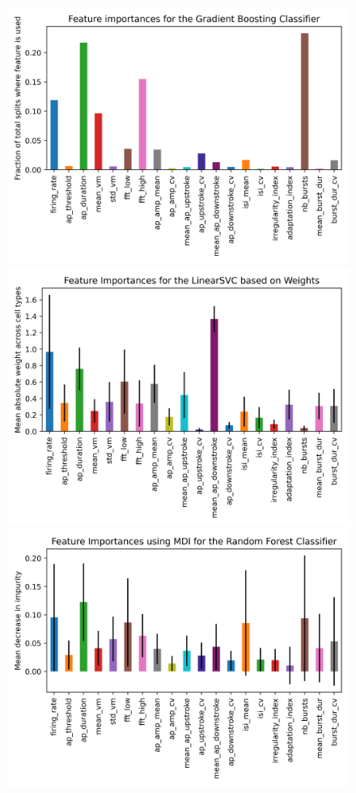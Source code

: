 \documentclass{IEEEtran}
\begin{document}
\begin{figure}[h!]
  \centering
  \includegraphics[width=0.9\columnwidth]{figures/feature_importance_gb.png}
  \includegraphics[width=0.9\columnwidth]{figures/feature_importance_linearsvc.png}
  \includegraphics[width=0.9\columnwidth]{figures/feature_importance_randomforest.png}

\end{figure}
\end{document}
